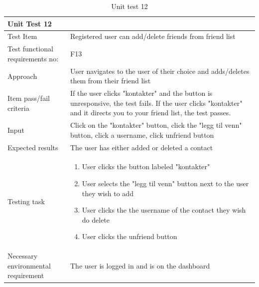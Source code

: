 \begin{table}[H]
\begin{tabular}{ | L{0.25\linewidth} | L{0.75\linewidth} | } 
 \hline {}
 Unit Test 12 &  \\
 \hline
 Test Item & Registered user can add/delete friends from friend list\\
 \hline
 Test functional requirements no: & F13
 \\
 \hline
 Approach & User navigates to the user of their choice and adds/deletes them from their friend list\\
  \hline
 Item pass/fail criteria & If the user clicks "kontakter" and the button is unresponsive, the test fails. If the user clicks "kontakter" and it directs you to your friend list, the test passes.\\
 \hline
 Input &  Click on the "kontakter" button, click the "legg til venn" button, click a username, click unfriend button\\ 
 \hline
 Expected results & The user has either added or deleted a contact\\
  \hline
Testing task &
    \vspace{-5mm}
    \begin{enumerate}[noitemsep]
  \item User clicks the button labeled "kontakter"
  \item User selects the "legg til venn" button next to the user they wish to add
  \item User clicks the the username of the contact they wish do delete
  \item User clicks the unfriend button
   \end{enumerate}\\
 \hline
 Necessary environmental requirement & The user is logged in and is on the dashboard\\ 
 \hline
\end{tabular}
\caption{Unit test 12}
\end{table}

